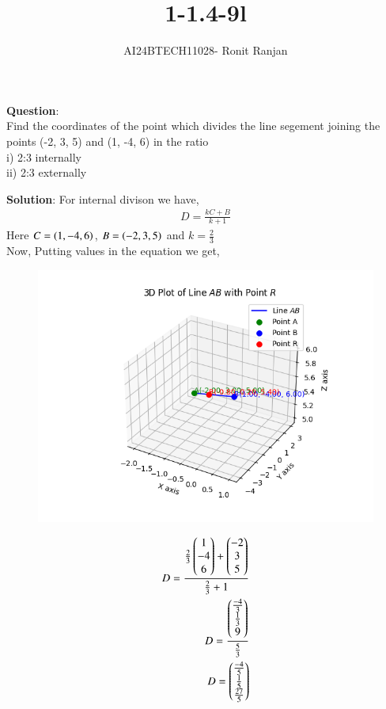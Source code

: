 \documentclass[journal]{IEEEtran}
\begin{document}

\vspace{3cm}

\title{1-1.4-9l}
\author{AI24BTECH11028- Ronit Ranjan}

{\let\newpage\relax\maketitle}

\renewcommand{\thefigure}{\theenumi}
\renewcommand{\thetable}{\theenumi}
\setlength{\intextsep}{10pt} %


\renewcommand{\thetable}{\theenumi}

\textbf{Question}: \\
Find the coordinates of the point which divides the line segement joining the points (-2, 3, 5) and (1, -4, 6) in the ratio\\
i) 2:3 internally\\
ii) 2:3 externally

\textbf{Solution}: For internal divison we have,\\
\begin{align}
    D = \frac{kC + B}{k + 1}
\end{align}
Here $C = \left(1, -4, 6\right)$, $B = \left(-2, 3, 5\right)$ and $k = \frac{2}{3}$\\
Now, Putting values in the equation we get,
\begin{figure}[hbt!]
		\centering
		\includegraphics[width=0.6\linewidth]{plots/plot1.png}

	\end{figure}
\begin{align}
D = \frac{\frac{2}{3}
 \begin{pmatrix}
   1
   \\
   -4
   \\
   6
 \end{pmatrix}
 +
 \begin{pmatrix}
   -2
   \\
   3 
   \\
   5
 \end{pmatrix}}{\frac{2}{3}+1}
 \\
 D = \frac{
  \begin{pmatrix}
  \frac{-4}{3}
  \\
  \frac{1}{3}
  \\
  9
  \end{pmatrix}
  }{\frac{5}{3}}
  \\
D = 
 \begin{pmatrix}
  \frac{-4}{5}
  \\
  \frac{1}{5}
  \\
  \frac{27}{5}
 \end{pmatrix}
 \end{align}
 
\end{document}

